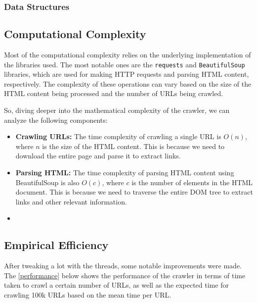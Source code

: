 \subsubsection{Data Structures}

\subsection{Computational Complexity}

Most of the computational complexity relies on the underlying implementation of the libraries used. The most notable ones are the \texttt{requests} and \texttt{BeautifulSoup} libraries, which are used for making HTTP requests and parsing HTML content, respectively. The complexity of these operations can vary based on the size of the HTML content being processed and the number of URLs being crawled.

So, diving deeper into the mathematical complexity of the crawler, we can analyze the following components:

\begin{itemize}
  \item \textbf{Crawling URLs:} The time complexity of crawling a single URL is $O(n)$, where $n$ is the size of the HTML content. This is because we need to download the entire page and parse it to extract links.
  \item \textbf{Parsing HTML:} The time complexity of parsing HTML content using BeautifulSoup is also $O(c)$, where $c$ is the number of elements in the HTML document. This is because we need to traverse the entire DOM tree to extract links and other relevant information.
  \item
\end{itemize}

\subsection{Empirical Efficiency}

After tweaking a lot with the threads, some notable improvements were made. The \autoref{performance} below shows the performance of the crawler in terms of time taken to crawl a certain number of URLs, as well as the expected time for crawling 100k URLs based on the mean time per URL.

